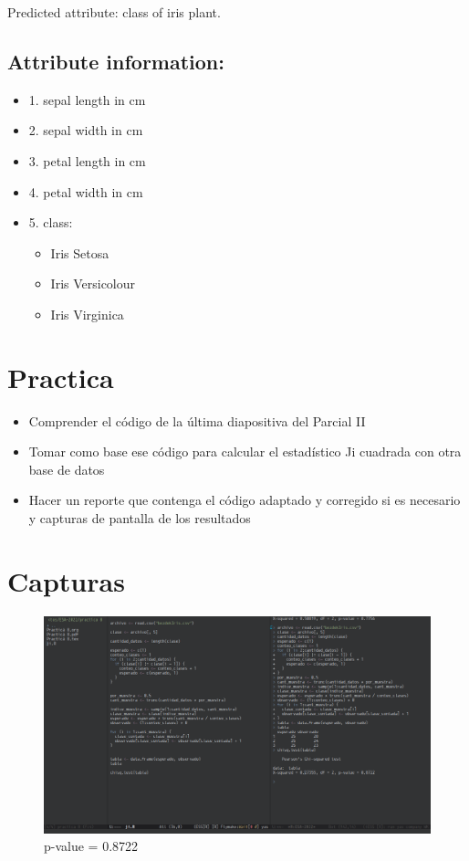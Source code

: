 \documentclass[12pt]{article}
\begin{document}
Predicted attribute: class of iris plant.

\subsection*{Attribute information:}
\label{sec:orgb941888}
\begin{itemize}
\item 1. sepal length in cm
\item 2. sepal width in cm
\item 3. petal length in cm
\item 4. petal width in cm
\item 5. class: 
\begin{itemize}
\item Iris Setosa
\item Iris Versicolour
\item Iris Virginica
\end{itemize}
\end{itemize}

\section*{Practica}
\label{sec:org7764bc1}
\begin{itemize}
\item Comprender el código de la última diapositiva del Parcial II
\item Tomar como base ese código para calcular el estadístico Ji cuadrada con otra base de datos
\item Hacer un reporte que contenga el código adaptado y corregido si es necesario y capturas de pantalla de los resultados
\end{itemize}

\section*{Capturas}
\label{sec:org139866e}

\begin{figure}[htbp]
\centering
\includegraphics[width=.9\linewidth]{img/1.png}
\caption{p-value = 0.8722}
\end{figure}
\end{document}
